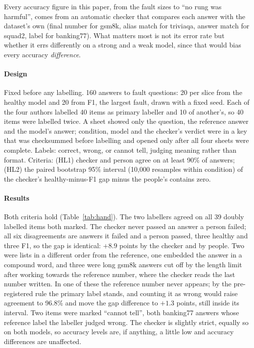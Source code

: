 \documentclass[11pt]{article}
\begin{document}
Every accuracy figure in this paper, from the fault sizes to ``no rung was
harmful'', comes from an automatic checker that compares each answer with the
dataset's own (final number for \textsf{gsm8k}, alias match for \textsf{triviaqa},
answer match for \textsf{squad2}, label for \textsf{banking77}). What matters most
is not its error rate but whether it errs differently on a strong and a weak model,
since that would bias every accuracy \emph{difference}.

\paragraph{Design} Fixed before any labelling. 160 answers to fault questions:
20 per slice from the healthy model and 20 from F1, the largest fault, drawn with
a fixed seed. Each of the four authors labelled 40 items as primary labeller and
10 of another's, so 40 items were labelled twice. A sheet showed only the
question, the reference answer and the model's answer; condition, model and the
checker's verdict were in a key that was checksummed before labelling and opened
only after all four sheets were complete. Labels: correct, wrong, or cannot tell,
judging meaning rather than format. Criteria: (HL1) checker and person agree on at
least 90\% of answers; (HL2) the paired bootstrap 95\% interval (10{,}000
resamples within condition) of the checker's healthy-minus-F1 gap minus the
people's contains zero.

\paragraph{Results} Both criteria hold (Table~\ref{tab:hand}). The two labellers
agreed on all 39 doubly labelled items both marked. The checker never passed an
answer a person failed; all six disagreements are answers it failed and a person
passed, three healthy and three F1, so the gap is identical: $+8.9$ points by the
checker and by people. Two were lists in a different order from the reference,
one embedded the answer in a compound word, and three were long \textsf{gsm8k}
answers cut off by the length limit after working towards the reference number,
where the checker reads the last number written. In one of these the reference
number never appears; by the pre-registered rule the primary label stands, and
counting it as wrong would raise agreement to 96.8\% and move the gap difference to
$+1.3$ points, still inside its interval. Two items were marked ``cannot tell'',
both \textsf{banking77} answers whose reference label the labeller judged wrong.
The checker is slightly strict, equally so on both models, so accuracy levels
are, if anything, a little low and accuracy differences are unaffected.
\end{document}
